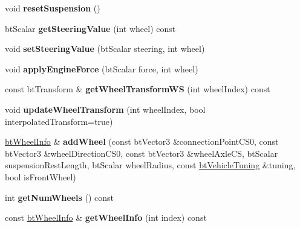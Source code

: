 \begin{DoxyCompactItemize}
\item 
\mbox{\label{classbtRaycastVehicle_a327f031abd00d7bee5546b7602d7fd6b}} 
void {\bfseries reset\+Suspension} ()
\item 
\mbox{\label{classbtRaycastVehicle_a61c029ffd3bec9c8404022ed20dd6264}} 
bt\+Scalar {\bfseries get\+Steering\+Value} (int wheel) const
\item 
\mbox{\label{classbtRaycastVehicle_afbbaf96eadb808cea4102b696abd4649}} 
void {\bfseries set\+Steering\+Value} (bt\+Scalar steering, int wheel)
\item 
\mbox{\label{classbtRaycastVehicle_aafe6f81794ec7ad1ce900bdca2facb92}} 
void {\bfseries apply\+Engine\+Force} (bt\+Scalar force, int wheel)
\item 
\mbox{\label{classbtRaycastVehicle_a30e803d12dbeb049ce7174dda04afbdc}} 
const bt\+Transform \& {\bfseries get\+Wheel\+Transform\+WS} (int wheel\+Index) const
\item 
\mbox{\label{classbtRaycastVehicle_adf67ae421334225c886c3dc4c12fe1f2}} 
void {\bfseries update\+Wheel\+Transform} (int wheel\+Index, bool interpolated\+Transform=true)
\item 
\mbox{\label{classbtRaycastVehicle_ab553ee172346b9cea796abd56ba12a40}} 
\hyperlink{structbtWheelInfo}{bt\+Wheel\+Info} \& {\bfseries add\+Wheel} (const bt\+Vector3 \&connection\+Point\+C\+S0, const bt\+Vector3 \&wheel\+Direction\+C\+S0, const bt\+Vector3 \&wheel\+Axle\+CS, bt\+Scalar suspension\+Rest\+Length, bt\+Scalar wheel\+Radius, const \hyperlink{classbtRaycastVehicle_1_1btVehicleTuning}{bt\+Vehicle\+Tuning} \&tuning, bool is\+Front\+Wheel)
\item 
\mbox{\label{classbtRaycastVehicle_a49c9df37ed439ba8a5fe3a0c4a07047d}} 
int {\bfseries get\+Num\+Wheels} () const
\item 
\mbox{\label{classbtRaycastVehicle_aeb29696567a0ad447f1d769f1b3b8e75}} 
const \hyperlink{structbtWheelInfo}{bt\+Wheel\+Info} \& {\bfseries get\+Wheel\+Info} (int index) const

\end{DoxyCompactItemize}
